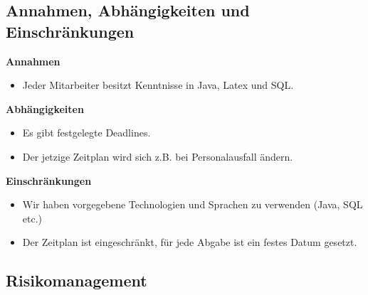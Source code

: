 \subsection{Annahmen, Abhängigkeiten und Einschränkungen}

\textbf{Annahmen}
\begin{itemize}
 \item Jeder Mitarbeiter besitzt Kenntnisse in Java, Latex und SQL.
\end{itemize}

\textbf{Abhängigkeiten}
\begin{itemize}
 \item Es gibt festgelegte Deadlines.
 \item Der jetzige Zeitplan wird sich z.B. bei Personalausfall ändern.
\end{itemize}

\textbf{Einschränkungen}
\begin{itemize}
 \item Wir haben vorgegebene Technologien und Sprachen zu verwenden (Java, SQL etc.) 
 \item Der Zeitplan ist eingeschränkt, für jede Abgabe ist ein festes Datum gesetzt.

\end{itemize}

\subsection{Risikomanagement}\label{riskmanagement}
